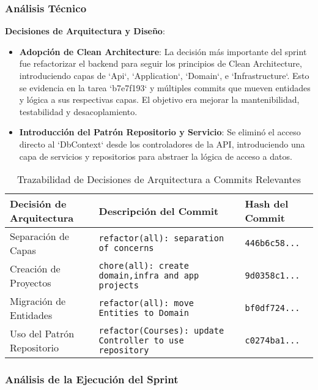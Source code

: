 \subsubsection{Análisis Técnico}

\textbf{Decisiones de Arquitectura y Diseño}:
\begin{itemize}
    \item \textbf{Adopción de Clean Architecture}: La decisión más importante del sprint fue refactorizar el backend para seguir los principios de Clean Architecture, introduciendo capas de `Api`, `Application`, `Domain`, e `Infrastructure`. Esto se evidencia en la tarea `b7e7f193` y múltiples commits que mueven entidades y lógica a sus respectivas capas. El objetivo era mejorar la mantenibilidad, testabilidad y desacoplamiento.
    \item \textbf{Introducción del Patrón Repositorio y Servicio}: Se eliminó el acceso directo al `DbContext` desde los controladores de la API, introduciendo una capa de servicios y repositorios para abstraer la lógica de acceso a datos.
\end{itemize}

\begin{table}[H]
    \caption{Trazabilidad de Decisiones de Arquitectura a Commits Relevantes}
    \label{tab:sprint-5-commit-traceability}
    \begin{tabularx}{\textwidth}{@{}lXl@{}}
        \toprule
        \textbf{Decisión de Arquitectura} & \textbf{Descripción del Commit} & \textbf{Hash del Commit} \\
        \midrule
        Separación de Capas & \texttt{refactor(all): separation of concerns} & \texttt{446b6c58...} \\
        Creación de Proyectos & \texttt{chore(all): create domain,infra and app projects} & \texttt{9d0358c1...} \\
        Migración de Entidades & \texttt{refactor(all): move Entities to Domain} & \texttt{bf0df724...} \\
        Uso del Patrón Repositorio & \texttt{refactor(Courses): update Controller to use repository} & \texttt{c0274ba1...} \\
        \bottomrule
    \end{tabularx}
\end{table}

\subsubsection{Análisis de la Ejecución del Sprint}

